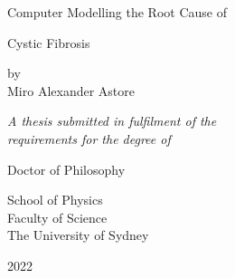 
\begin{titlepage}

\begin{center}

\vspace*{0.1in}

\begin{LARGE}
Computer Modelling the Root Cause of  \\ 
\end{LARGE}
\vspace*{0.1in}
\begin{LARGE}
Cystic Fibrosis
\end{LARGE}

\vspace{1.0in}
\begin{large}
by\\
\vspace{0.3in}
Miro Alexander Astore
\vspace{1.0in}

\textit{A thesis submitted in fulfilment of the}\\
\textit{requirements for the degree of}

\vspace{0.6in}

Doctor of Philosophy

\vspace{1.0in}

School of Physics\\
Faculty of Science\\
\vspace{0.05in}
The University of Sydney

\vspace{1.0in}

2022
\end{large}

\end{center}
\end{titlepage}
